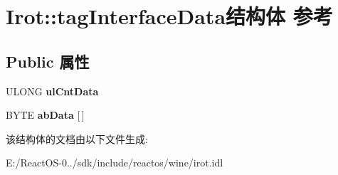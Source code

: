 \hypertarget{struct_irot_1_1tag_interface_data}{}\section{Irot\+:\+:tag\+Interface\+Data结构体 参考}
\label{struct_irot_1_1tag_interface_data}
\subsection*{Public 属性}
\begin{DoxyCompactItemize}
\item 
\mbox{\label{struct_irot_1_1tag_interface_data_a5288a820e03bee4a01c5ea23398718cd}} 
U\+L\+O\+NG {\bfseries ul\+Cnt\+Data}
\item 
\mbox{\label{struct_irot_1_1tag_interface_data_ad1f5901575b64e9cc2bc3b1b8cddb9bd}} 
B\+Y\+TE {\bfseries ab\+Data} \mbox{[}$\,$\mbox{]}
\end{DoxyCompactItemize}


该结构体的文档由以下文件生成\+:\begin{DoxyCompactItemize}
\item 
E\+:/\+React\+O\+S-\/0../sdk/include/reactos/wine/irot.\+idl\end{DoxyCompactItemize}
